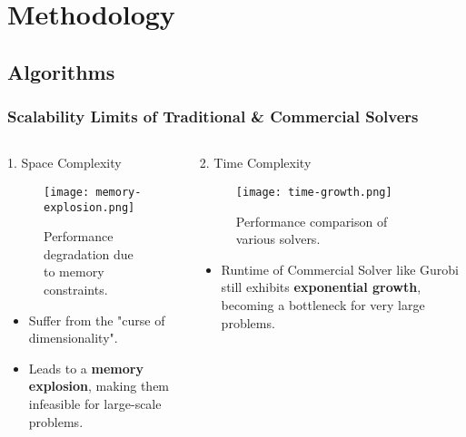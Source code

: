 \section{Methodology}

\subsection{Algorithms}

\begin{frame}
    \frametitle{Scalability Limits of Traditional \& Commercial Solvers}

    \begin{columns}[T]
        
        \begin{column}{0.5\textwidth}
            \begin{block}{1. Space Complexity}
                \begin{figure}
                    \texttt{[image: memory-explosion.png]} 
                    \caption{Performance degradation due to memory constraints.}
                \end{figure}
                \vspace{-1.2em}
                \begin{itemize}
                    \item Suffer from the "curse of dimensionality".
                    \item Leads to a \textbf{memory explosion}, making them infeasible for large-scale problems.
                \end{itemize}
            \end{block}
        \end{column}

        \begin{column}{0.5\textwidth}
            \begin{block}{2. Time Complexity}
                \begin{figure}
                    \texttt{[image: time-growth.png]}
                    \caption{Performance comparison of various solvers.}
                \end{figure}
                \vspace{-1.2em}
                \begin{itemize}
                    \item Runtime of Commercial Solver like Gurobi still exhibits \textbf{exponential growth}, becoming a bottleneck for very large problems.
                \end{itemize}
            \end{block}
        \end{column}

    \end{columns}
\end{frame}


